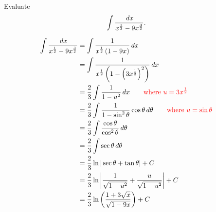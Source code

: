 \documentclass[]{ximera}
\begin{document}
\begin{problem}
Evaluate
	\[
	\int \frac{\,d x}{x^{\frac{1}{2}} - 9x^{\frac{3}{2}}}.
	\]
	\begin{freeResponse}
		\begin{align*}
		\int \frac{\,d x}{x^{\frac{1}{2}} - 9x^{\frac{3}{2}}}
		&= \int \frac{1}{x^{\frac{1}{2}} \left( 1 - 9x \right)} \,d x  \\
		&= \int \frac{1}{x^{\frac{1}{2}} \left( 1 - \left( 3x^{\frac{1}{2}} \right)^2 \right)} \,d x  \\
		&= \frac{2}{3} \int \frac{1}{1-u^2} \,d x 	\qquad	{\color{red}\text{where }u=3x^{\frac{1}{2}}}  \\
		&= \frac{2}{3} \int \frac{1}{1-\sin^2 \theta} \cos \theta \,d \theta	\qquad	{\color{red} \text{where } u=\sin \theta}  \\
		&= \frac{2}{3} \int \frac{\cos \theta}{\cos^2 \theta} \,d \theta  \\
		&= \frac{2}{3} \int \sec \theta \,d \theta  \\
		&= \frac{2}{3} \ln | \sec \theta + \tan \theta | + C  \\
		&= \frac{2}{3} \ln \left| \frac{1}{\sqrt{1-u^2}} + \frac{u}{\sqrt{1-u^2}} \right| + C  \\
		&= \frac{2}{3} \ln \left( \frac{1 + 3\sqrt{x}}{\sqrt{1-9x}} \right) + C
		\end{align*}
		
	\end{freeResponse}

\end{problem}

\begin{instructorNotes}

\end{instructorNotes}
















	
	
	
	
	
	
	
	
	

	










								
				
				
	
\end{document}
